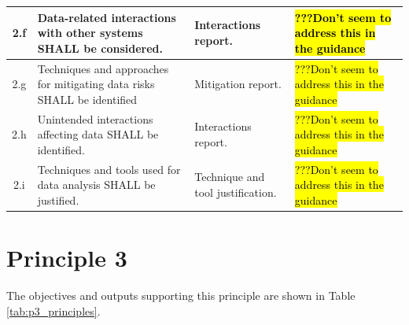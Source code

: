 {\begin{longtable}{|C{}|L{}|L{}|L{}|}
	  \\\hline
	2.f &%
	  Data-related interactions with other systems SHALL be considered.&%
	  Interactions report.&%
	  \hl{???Don't seem to address this in the guidance}%
	  \\\hline
	2.g &%
	  Techniques and approaches for mitigating data risks SHALL be identified&%
	  Mitigation report.&%
	  \hl{???Don't seem to address this in the guidance}%
	  \\\hline
	2.h &%
	  Unintended interactions affecting data SHALL be identified.&%
	  Interactions report.&%
	  \hl{???Don't seem to address this in the guidance}%
	  \\\hline
	2.i &%
	  Techniques and tools used for data analysis SHALL be justified.&%
	  Technique and tool justification.&%
	  \hl{???Don't seem to address this in the guidance}%
	  \\\hline
\end{longtable}
\cbend
\section{Principle 3}

The objectives and outputs supporting this principle are shown in Table \ref{tab:p3_principles}.

}
